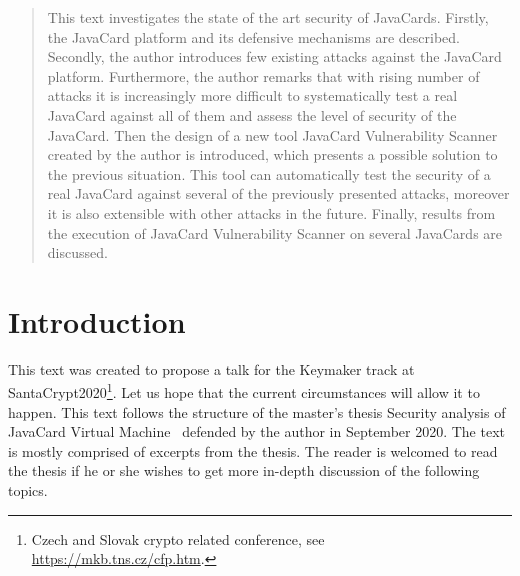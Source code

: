 \documentclass{../llncs/llncs}
\begin{document}
\maketitle

\begin{abstract}
This text investigates the state of the art security of JavaCards. Firstly, the JavaCard platform and its defensive mechanisms are described. Secondly, the author introduces few existing attacks against the JavaCard platform. Furthermore, the author remarks that with rising number of attacks it is increasingly more difficult to systematically test a real JavaCard against all of them and assess the level of security of the JavaCard. Then the design of a new tool JavaCard Vulnerability Scanner created by the author is introduced, which presents a possible solution to the previous situation. This tool can automatically test the security of a real JavaCard against several of the previously presented attacks, moreover it is also extensible with other attacks in the future. Finally, results from the execution of JavaCard Vulnerability Scanner on several JavaCards are discussed.
\end{abstract}



\section{Introduction}

This text was created to propose a talk for the Keymaker track at  SantaCrypt2020\footnote{Czech and Slovak crypto related conference, see \url{https://mkb.tns.cz/cfp.htm}.}. Let us hope that the current circumstances will allow it to happen. This text follows the structure of the master's thesis Security analysis of JavaCard Virtual Machine~\cite{anon2020thesis} defended by the author in September 2020. The text is mostly comprised of excerpts from the thesis. The reader is welcomed to read the thesis if he or she wishes to get more in-depth discussion of the following topics.
\end{document}
